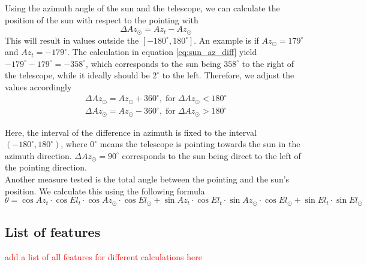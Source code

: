 Using the azimuth angle of the sun and the telescope, we can calculate the position of the sun with respect to the pointing with
\begin{equation}\label{eq:sun_az_diff}
    \Delta \textit{Az}_\odot = \textit{Az}_{\textit{t}} - \textit{Az}_\odot
\end{equation}
This will result in values outside the $[-180^\circ,180^\circ]$. An example is if $Az_\odot=179^\circ$ and $Az_t = -179^\circ$.
The calculation in equation \eqref{eq:sun_az_diff} yield $-179^\circ-179^\circ=-358^\circ$,
which corresponds to the sun being $358^\circ$ to the right of the telescope, while it ideally should be $2^\circ$ to the left.
Therefore, we adjust the values accordingly
\begin{align}
    \Delta Az_\odot = Az_\odot +360^\circ, \; \text{for} \; \Delta Az_\odot < 180^\circ\\
    \Delta Az_\odot = Az_\odot -360^\circ, \; \text{for} \; \Delta Az_\odot > 180^\circ
\end{align}

Here, the interval of the difference in azimuth is fixed to the interval $(-180^\circ,180^\circ)$,
where $0^\circ$ means the telescope is pointing towards the sun in the azimuth direction.
$\Delta \textit{Az}_\odot = 90^\circ$ corresponds to the sun being direct to the left of the pointing direction. \\

Another measure tested is the total angle between the pointing and the sun's position. We calculate this using the following formula
\begin{equation}
    \theta = \cos \textit{Az}_t \cdot \cos \textit{El}_t\cdot \cos \textit{Az}_\odot \cdot \cos \textit{El}_\odot + \sin \textit{Az}_t \cdot \cos \textit{El}_t\cdot \sin \textit{Az}_\odot \cdot \cos \textit{El}_\odot + \sin \textit{El}_t \cdot \sin \textit{El}_\odot
\end{equation}

\subsection{List of features}
\textcolor{red}{add a list of all features for different calculations here}

